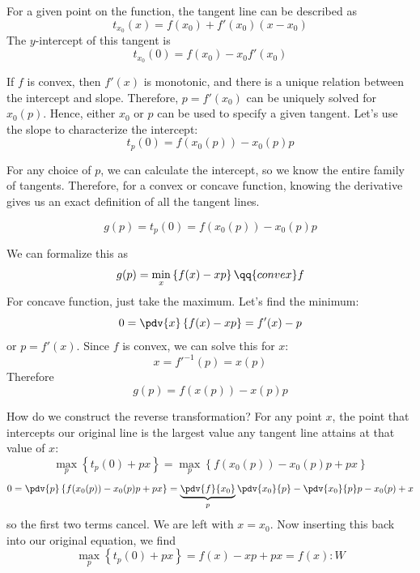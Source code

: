 \documentclass[a4paper,twoside,master.tex]{subfiles}
\begin{document}
For a given point on the function, the tangent line can be described as
\begin{equation}
    t_{x_0}(x) = f(x_0) + f'(x_0) (x - x_0)
\end{equation}
The $ y $-intercept of this tangent is
\begin{equation}
    t_{x_0}(0) = f(x_0) - x_0 f'(x_0)
\end{equation}

If $ f $ is convex, then $ f'(x) $ is monotonic, and there is a unique relation between the intercept and slope. Therefore, $ p = f'(x_0) $ can be uniquely solved for $ x_0(p) $. Hence, either $ x_0 $ or $ p $ can be used to specify a given tangent. Let's use the slope to characterize the intercept:
\begin{equation}
    t_p(0) = f(x_0(p)) - x_0(p) p
\end{equation}

For any choice of $ p $, we can calculate the intercept, so we know the entire family of tangents. Therefore, for a convex or concave function, knowing the derivative gives us an exact definition of all the tangent lines.

\begin{equation}\label{eq:legendre_transform}
    g(p) = t_p(0) = f(x_0(p)) - x_0(p) p\tag{Legendre Transformation}
\end{equation}

We can formalize this as
\begin{equation}
    g(p) = \min_x\left\{ f(x) - xp \right\} \qq{convex } f
\end{equation}
For concave function, just take the maximum. Let's find the minimum:
\begin{equation}
    0 = \pdv{x}\left\{ f(x) - xp \right\} = f'(x) - p
\end{equation}
or $ p = f'(x) $. Since $ f $ is convex, we can solve this for $ x $:
\begin{equation}
    x = f'^{-1}(p) = x(p)
\end{equation}
Therefore
\begin{equation}
    g(p) = f(x(p)) - x(p) p
\end{equation}


How do we construct the reverse transformation? For any point $ x $, the point that intercepts our original line is the largest value any tangent line attains at that value of $ x $:
\begin{equation}
    \max_p\left\{ t_p(0) + px \right\} = \max_p \left\{ f(x_0(p)) - x_0(p) p + px \right\}
\end{equation}
\begin{equation}
    0 = \pdv{p}\left\{ f(x_0(p)) - x_0(p) p + px \right\} = \underbrace{\pdv{f}{x_0}}_{p} \pdv{x_0}{p} - \pdv{x_0}{p} p - x_0(p) + x
\end{equation}
so the first two terms cancel. We are left with $ x = x_0 $. Now inserting this back into our original equation, we find
\begin{equation}
    \max_p\left\{ t_p(0) + px \right\} = f(x) - xp + px = f(x):W
\end{equation}
\end{document}
